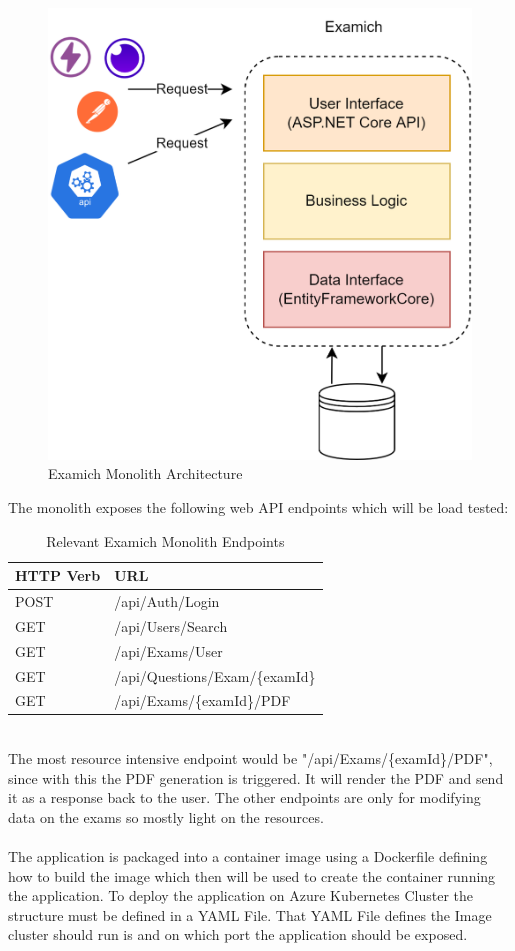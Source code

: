\documentclass[BIF,Bachelor,nenglish]{twbook}%
\begin{document}
\begin{figure} [H]
 \begin{center}
    \includegraphics[width=0.6\linewidth]{img/ExamichMonolith.png}
 \end{center}
 \caption{Examich Monolith Architecture}
 \label{examichMonolith}
\end{figure}

\noindent
The monolith exposes the following web \ac{API} endpoints which will be load tested:

\begin{table}[!ht]
    \centering
    \begin{tabular}{|l|l|}
    \hline
        \ac{HTTP} Verb & URL \\ \hline
        POST & /api/Auth/Login \\ \hline
        GET & /api/Users/Search \\ \hline
        GET & /api/Exams/User \\ \hline
        GET & /api/Questions/Exam/\{examId\} \\ \hline
        GET & /api/Exams/\{examId\}/PDF \\ \hline
    \end{tabular}
 \caption{Relevant Examich Monolith Endpoints}
 \label{examichMonolithEndpoints}
\end{table}
\noindent
\\
The most resource intensive endpoint would be "/api/Exams/\{examId\}/PDF", since with this the PDF generation is triggered. It will render the PDF and send it as a response back to the user. The other endpoints are only for modifying data on the exams so mostly light on the resources.
\\
\\
\noindent
The application is packaged into a container image using a Dockerfile defining how to build the image which then will be used to create the container running the application. To deploy the application on Azure Kubernetes Cluster the structure must be defined in a YAML File. That YAML File defines the Image cluster should run is and on which port the application should be exposed.
\end{document}
